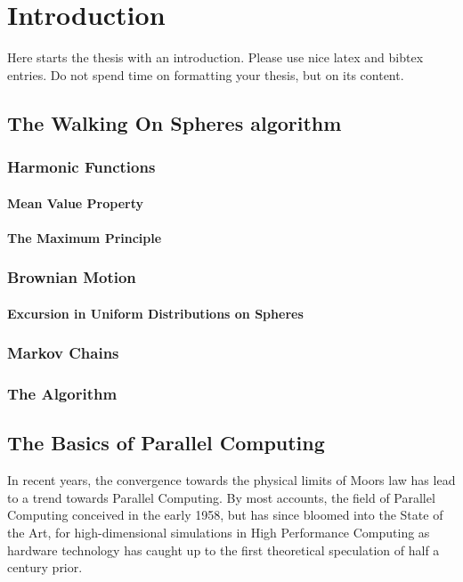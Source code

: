 \chapter{Introduction}
\label{chapter:Introduction}



Here starts the thesis with an introduction. Please use nice latex and bibtex entries\cite{Sabelfeld}. Do not spend time on formatting your thesis, but on its content.

\section{The Walking On Spheres algorithm}

\subsection{Harmonic Functions}
\subsubsection{Mean Value Property}
\subsubsection{The Maximum Principle}
\subsection{Brownian Motion}
\subsubsection{Excursion in Uniform Distributions on Spheres}
\subsection{Markov Chains}
\subsection{The Algorithm}



\section{The Basics of Parallel Computing}
In recent years, the convergence towards the physical limits of Moors law has lead to a
trend towards Parallel Computing\cite{Kumar}\cite{Markov}.  By most accounts, the
field of Parallel Computing conceived in the early 1958\cite{Gill}, but has
since bloomed into the State of the Art, for high-dimensional simulations in
High Performance Computing as hardware technology has caught up to the first
theoretical speculation of half a century prior. \par

